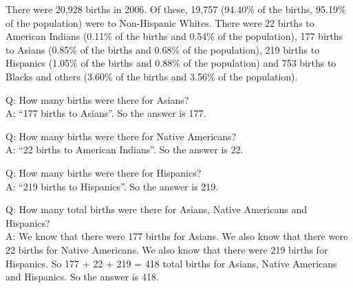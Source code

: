There were 20,928 births in 2006. Of these, 19,757 (94.40\% of the births, 95.19\% of the population) were to Non-Hispanic Whites. There were 22 births to American Indians (0.11\% of the births and 0.54\% of the population), 177 births to Asians (0.85\% of the births and 0.68\% of the population), 219 births to Hispanics (1.05\% of the births and 0.88\% of the population) and 753 births to Blacks and others (3.60\% of the births and 3.56\% of the population).

Q: How many births were there for Asians?\\
A: ``177 births to Asians''. So the answer is 177.

Q: How many births were there for Native Americans?\\
A: ``22 births to American Indians''. So the answer is 22.

Q: How many births were there for Hispanics?\\
A:  ``219 births to Hispanics''. So the answer is 219.

Q: How many total births were there for Asians, Native Americans and Hispanics?\\
A: We know that there were 177 births for Asians. We also know that there were 22 births for Native Americans. We also know that there were 219 births for Hispanics. So 177 + 22 + 219 = 418 total births for Asians, Native Americans and Hispanics. So the answer is 418.
